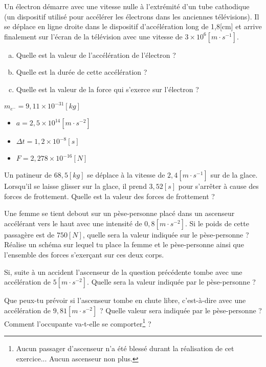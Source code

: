 \begin{exercise}
    Un électron démarre avec une vitesse nulle à l'extrémité d'un tube cathodique (un dispositif utilisé pour accélérer les électrons dans les anciennes télévisions). Il se déplace en ligne droite dans le dispositif d'accélération long de 1,8[cm] et arrive finalement sur l'écran de la télévision avec une vitesse de \(3 \times 10^{6}[m \cdot s^{-1}]\).
    \begin{enumerate}[a)]
        \item Quelle est la valeur de l'accélération de l'électron ?
        \item Quelle est la durée de cette accélération ?
        \item Quelle est la valeur de la force qui s'exerce sur l'électron ?
    \end{enumerate}
    \(m_{e^-}=9,11 \times 10^{-31}[kg]\)
\end{exercise}
\begin{solution}
    \begin{itemize}
        \item \(a=2,5 \times 10^{14} [m \cdot s^{-2}]\)
        \item \(\Delta t=1,2 \times 10^{-8}[s]\)
        \item \(F=2,278 \times 10^{-16} [N]\)
    \end{itemize}
\end{solution}

\begin{exercise}
    Un patineur de \(68,5[kg]\) se déplace à la vitesse de \(2,4[m \cdot s^{-1}]\) sur de la glace. Lorsqu'il se laisse glisser sur la glace, il prend \(3,52[s]\) pour s'arrêter à cause des forces de frottement. Quelle est la valeur des forces de frottement ?
\end{exercise}

\begin{exercise}
    Une femme se tient debout sur un pèse-personne placé dans un ascenseur accélérant vers le haut avec une intensité de \(0,8[m \cdot s^{-2}]\). Si le poids de cette passagère est de \(750[N]\), quelle sera la valeur indiquée sur le pèse-personne ? Réalise un schéma sur lequel tu place la femme et le pèse-personne ainsi que l'ensemble des forces s'exerçant sur ces deux corps.
\end{exercise}

\begin{exercise}
    Si, suite à un accident l'ascenseur de la question précédente tombe avec une accélération de \(5[m \cdot s^{-2}]\). Quelle sera la valeur indiquée par le pèse-personne ?
\end{exercise}

\begin{exercise}
    Que peux-tu prévoir si l'ascenseur tombe en chute libre, c'est-à-dire avec une accélération de \(9,81[m \cdot s^{-2}]\) ? Quelle valeur sera indiquée par le pèse-personne ? Comment l'occupante va-t-elle se comporter\footnote{Aucun passager d'ascenseur n'a été blessé durant la réalisation de cet exercice... Aucun ascenseur non plus.} ?
\end{exercise}